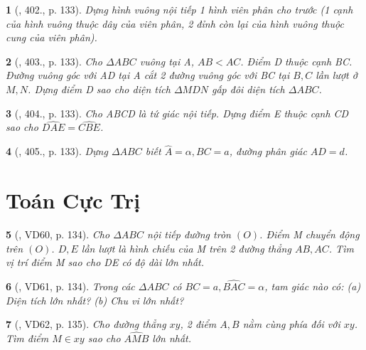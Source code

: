 \documentclass{article}
\newtheorem{baitoan}{}
\begin{document}
\begin{baitoan}[\cite{Binh_Toan_9_tap_2}, 402., p. 133]
	Dựng hình vuông nội tiếp 1 hình viên phân cho trước (1 cạnh của hình vuông thuộc dây của viên phân, 2 đỉnh còn lại của hình vuông thuộc cung của viên phân).
\end{baitoan}

\begin{baitoan}[\cite{Binh_Toan_9_tap_2}, 403., p. 133]
	Cho $\Delta ABC$ vuông tại A, $AB < AC$. Điểm D thuộc cạnh BC. Đường vuông góc với AD tại A cắt 2 đường vuông góc với BC tại $B,C$ lần lượt ở $M,N$. Dựng điểm D sao cho diện tích $\Delta MDN$ gấp đôi diện tích $\Delta ABC$.
\end{baitoan}

\begin{baitoan}[\cite{Binh_Toan_9_tap_2}, 404., p. 133]
	Cho ABCD là tứ giác nội tiếp. Dựng điểm E thuộc cạnh CD sao cho $\widehat{DAE} = \widehat{CBE}$.
\end{baitoan}

\begin{baitoan}[\cite{Binh_Toan_9_tap_2}, 405., p. 133]
	Dựng $\Delta ABC$ biết $\widehat{A} = \alpha,BC = a$, đường phân giác $AD = d$.
\end{baitoan}


\section{Toán Cực Trị}

\begin{baitoan}[\cite{Binh_Toan_9_tap_2}, VD60, p. 134]
	Cho $\Delta ABC$ nội tiếp đường tròn $(O)$. Điểm M chuyển động trên $(O)$. $D,E$ lần lượt là hình chiếu của M trên 2 đường thẳng $AB,AC$. Tìm vị trí điểm M sao cho DE có độ dài lớn nhất.
\end{baitoan}

\begin{baitoan}[\cite{Binh_Toan_9_tap_2}, VD61, p. 134]
	Trong các $\Delta ABC$ có $BC = a,\widehat{BAC} = \alpha$, tam giác nào có: (a) Diện tích lớn nhất? (b) Chu vi lớn nhất?
\end{baitoan}

\begin{baitoan}[\cite{Binh_Toan_9_tap_2}, VD62, p. 135]
	Cho đường thẳng $xy$, 2 điểm $A,B$ nằm cùng phía đối với $xy$. Tìm điểm $M\in xy$ sao cho $\widehat{AMB}$ lớn nhất.
\end{baitoan}
\end{document}
